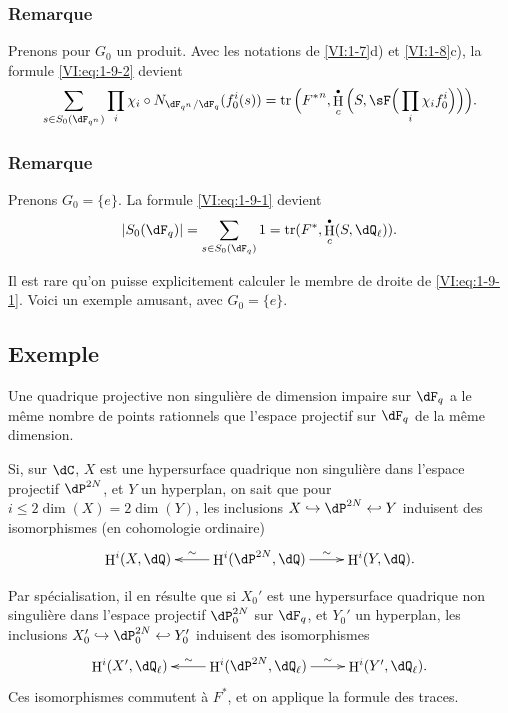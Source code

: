 \documentclass[oneside]{book}
\DeclareMathOperator{\h}{H}
\DeclareMathOperator{\tr}{tr}
\theoremstyle{sga-source}
\theoremstyle{sga-source-dash}
\theoremstyle{sga-source-dotdash}
\theoremstyle{sga-source-number-note-dash}
\theoremstyle{sga-source-note-number-dotdash}
\theoremstyle{sga-source-example-dotdash}
\theoremstyle{sga-source-inline-number}
\theoremstyle{sga-source-bare-number}
\theoremstyle{sga-source}
\let\oldbullet\bullet
\renewcommand{\bullet}{\textnormal{\tiny$\oldbullet$}}
\newcommand{\PrintPage}[1]{}\newcommand{\MathPage}[1]{}\newcommand{\PrintCite}[2]{#1}\newcommand{\var}[3]{#1}
\begin{document}
\addtocounter{subsubsection}{2}
\subsubsection{Remarque}\label{VI:1-9-3}

Prenons pour $G_0$ un produit. Avec les notations de \ref{VI:1-7}d) et 
\ref{VI:1-8}c), la formule \eqref{VI:eq:1-9-2} devient 
\[
  \sum_{s\in S_0(\dF_{q^n})} \prod_i \chi_i\circ N_{\dF_{q^n}/\dF_q} (f_0^i(s)) = \tr\Big({F^\ast}^n, \h_c^\bullet\Big(S,\sF\Big(\prod_i \chi_i f_0^i\Big)\Big)\Big) \text{.}
\]





\subsubsection{Remarque}\label{VI:1-9-4}

Prenons $G_0=\{e\}$. La formule \eqref{VI:eq:1-9-1} devient 
\[
  \left|S_0(\dF_q)\right| = \sum_{s\in S_0(\dF_q)} 1 = \tr(F^\ast,\h_c^\bullet(S,\dQ_\ell)) \text{.}
\]

Il est rare qu'on puisse explicitement calculer le membre de droite de 
\eqref{VI:eq:1-9-1}. Voici un exemple amusant, avec $G_0=\{e\}$. 





\PrintPage{175}
\subsection{Exemple}\label{VI:1-10}

Une quadrique projective non singulière de dimension impaire sur \texorpdfstring{$\dF_q$}{Fq} a le même nombre de points rationnels que l'espace projectif sur \texorpdfstring{$\dF_q$}{Fq} de la même dimension.

Si, sur $\dC$, $X$ est une hypersurface quadrique non singulière dans 
l'espace projectif $\dP^{2 N}$, et $Y$ un hyperplan, on sait que pour 
$i\leqslant 2\dim(X)=2\dim(Y)$, les inclusions 
$X\hookrightarrow \dP^{2 N}\hookleftarrow Y$ induisent des isomorphismes (en 
cohomologie ordinaire) 
\[\xymatrix{
  \h^i(X,\dQ) 
    & \ar[l]_-\sim \h^i(\dP^{2 N},\dQ) \ar[r]^-\sim 
    & \h^i(Y,\dQ) \text{.}
}\]

Par spécialisation, il en résulte que si $X_0'$ est une hypersurface 
quadrique non singulière dans l'espace projectif $\dP_0^{2 N}$ sur $\dF_q$, 
et $Y_0'$ un hyperplan, les inclusions 
$X_0'\hookrightarrow \dP_0^{2 N}\hookleftarrow Y_0'$ induisent des 
isomorphismes 
\[\xymatrix{
  \h^i(X',\dQ_\ell) 
    & \ar[l]_-\sim \h^i(\dP^{2 N},\dQ_\ell) \ar[r]^-\sim 
    & \h^i(Y',\dQ_\ell) \text{.}
}\]
Ces isomorphismes commutent à $F^\ast$, et on applique la formule des traces. 
\end{document}
